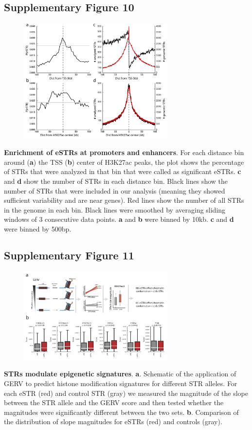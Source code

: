 \subsection{Supplementary Figure 10}
\begin{figure}[h!]
\centering
\label{fig:estrsupfig10}
\includegraphics[width=0.7\textwidth]{Figures/Chapter4/SuppFig10.jpg}
\end{figure}
\textbf{Enrichment of eSTRs at promoters and enhancers}. For each distance bin around (\textbf{a}) the TSS (\textbf{b}) center of H3K27ac peaks, the plot shows the percentage of STRs that were analyzed in that bin that were called as significant eSTRs. \textbf{c} and \textbf{d} show the number of STRs in each distance bin. Black lines show the number of STRs that were included in our analysis (meaning they showed sufficient variability and are near genes). Red lines show the number of all STRs in the genome in each bin. Black lines were smoothed by averaging sliding windows of 3 consecutive data points. \textbf{a} and 
\textbf{b} were binned by 10kb. \textbf{c} and \textbf{d} were binned by 500bp.

\pagebreak
\subsection{Supplementary Figure 11}
\begin{figure}[h!]
\centering
\label{fig:estrsupfig11}
\includegraphics[width=0.7\textwidth]{Figures/Chapter4/SuppFig11.jpg}
\end{figure}
\textbf{STRs modulate epigenetic signatures}. \textbf{a}. Schematic of the application of GERV to predict histone modification signatures for different STR alleles. For each eSTR (red) and control STR (gray) we measured the magnitude of the slope between the STR allele and the GERV score and then tested whether the magnitudes were significantly different between the two sets. \textbf{b}. Comparison of the distribution of slope magnitudes for eSTRs (red) and controls (gray).

